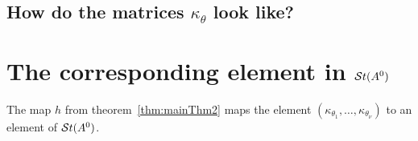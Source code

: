 \subsection{How do the matrices $\kappa_\theta$ look like?}

\section{The corresponding element in $\mathcal{S}{}t(A^0)$}
The map $h$ from theorem~\ref{thm:mainThm2} maps the element
$(\kappa_{\theta_1},\dots,\kappa_{\theta_\nu})$ to an element of $\mathcal{S}{}t(A^0)$.
